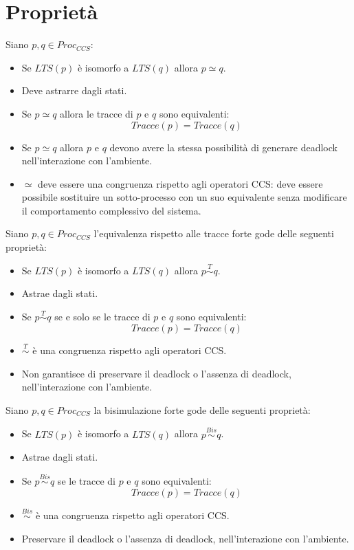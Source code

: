 \section{Proprietà}
Siano $p, q \in Proc_{CCS}$:
\begin{itemize}
    \item Se $LTS(p)$ è isomorfo a $LTS(q)$ allora $p \simeq q$.
    \item Deve astrarre dagli stati.
    \item Se $p \simeq q$ allora le tracce di $p$ e $q$ sono equivalenti: $$Tracce(p) = Tracce(q)$$
    \item Se $p \simeq q$ allora $p$ e $q$ devono avere la stessa possibilità di generare deadlock nell'interazione con l'ambiente.
    \item $\simeq$ deve essere una congruenza rispetto agli operatori CCS: deve essere possibile sostituire un sotto-processo con un suo equivalente senza modificare il comportamento complessivo del sistema.
\end{itemize}
Siano $p, q \in Proc_{CCS}$ l'equivalenza rispetto alle tracce forte gode delle seguenti proprietà:
\begin{itemize}
    \item Se $LTS(p)$ è isomorfo a $LTS(q)$ allora $p \stackrel{T}{\sim} q$.
    \item Astrae dagli stati.
    \item Se $p \stackrel{T}{\sim} q$ se e solo se le tracce di $p$ e $q$ sono equivalenti: $$Tracce(p) = Tracce(q)$$
    \item $\stackrel{T}{\sim}$ è una congruenza rispetto agli operatori CCS.
    \item Non garantisce di preservare il deadlock o l'assenza di deadlock, nell'interazione con l'ambiente.
\end{itemize}
Siano $p, q \in Proc_{CCS}$ la bisimulazione forte gode delle seguenti proprietà:
\begin{itemize}
    \item Se $LTS(p)$ è isomorfo a $LTS(q)$ allora $p \stackrel{Bis}{\sim} q$.
    \item Astrae dagli stati.
    \item Se $p \stackrel{Bis}{\sim} q$ se le tracce di $p$ e $q$ sono equivalenti: $$Tracce(p) = Tracce(q)$$
    \item $\stackrel{Bis}{\sim}$ è una congruenza rispetto agli operatori CCS.
    \item Preservare il deadlock o l'assenza di deadlock, nell'interazione con l'ambiente.
\end{itemize}

